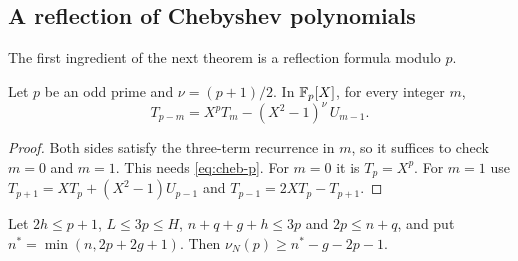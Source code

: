 \subsection{A reflection of Chebyshev polynomials}
The first ingredient of the next theorem is a reflection formula modulo $p$.

\begin{lemma}\label{lem:u3-reflect}
Let $p$ be an odd prime and $\nu=(p+1)/2$. In $\mathbb F_p[X]$, for every integer $m$,
\[
 T_{p-m}=X^pT_m-(X^2-1)^{\nu}\,U_{m-1}.
\]
\end{lemma}

\begin{proof}
Both sides satisfy the three-term recurrence in $m$, so it suffices to check $m=0$ and $m=1$. This
needs \eqref{eq:cheb-p}. For $m=0$ it is $T_p=X^p$. For $m=1$ use $T_{p+1}=XT_p+(X^2-1)U_{p-1}$ and
$T_{p-1}=2XT_p-T_{p+1}$.
\end{proof}

\begin{theorem}\label{thm:U}
Let $2h\le p+1$, $L\le3p\le H$, $n+q+g+h\le3p$ and $2p\le n+q$, and put $n^*=\min(n,2p+2g+1)$. Then
$\nu_N(p)\ge n^*-g-2p-1$.
\end{theorem}

